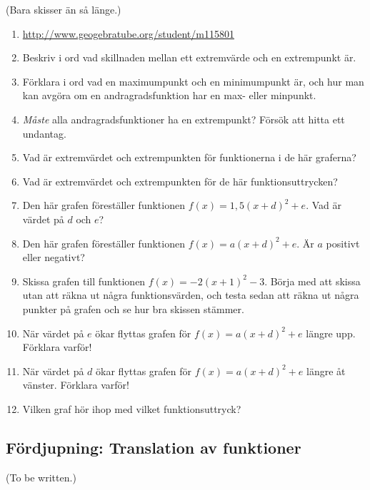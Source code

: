(Bara skisser än så länge.)

\begin{enumerate}
  \item \url{http://www.geogebratube.org/student/m115801}
  \item Beskriv i ord vad skillnaden mellan ett extremvärde och en extrempunkt är.
  \item Förklara i ord vad en maximumpunkt och en minimumpunkt är, och hur man kan avgöra om en andragradsfunktion har en max- eller minpunkt.
  \item \emph{Måste} alla andragradsfunktioner ha en extrempunkt? Försök att hitta ett undantag.
  \item Vad är extremvärdet och extrempunkten för funktionerna i de här graferna?
  \item Vad är extremvärdet och extrempunkten för de här funktionsuttrycken?
  \item Den här grafen föreställer funktionen $f(x)=1{,}5(x+d)^2+e$. Vad är värdet på $d$ och $e$?
  \item Den här grafen föreställer funktionen $f(x)=a(x+d)^2+e$. Är $a$ positivt eller negativt?
  \item Skissa grafen till funktionen $f(x)=-2(x+1)^2-3$.
  Börja med att skissa utan att räkna ut några funktionsvärden, och testa sedan att räkna ut några punkter på grafen och se hur bra skissen stämmer.
  \item När värdet på $e$ ökar flyttas grafen för $f(x)=a(x+d)^2+e$ längre upp. Förklara varför!
  \item När värdet på $d$ ökar flyttas grafen för $f(x)=a(x+d)^2+e$ längre åt vänster. Förklara varför!
  \item Vilken graf hör ihop med vilket funktionsuttryck?

\end{enumerate}

\subsection{Fördjupning: Translation av funktioner}

(To be written.)
